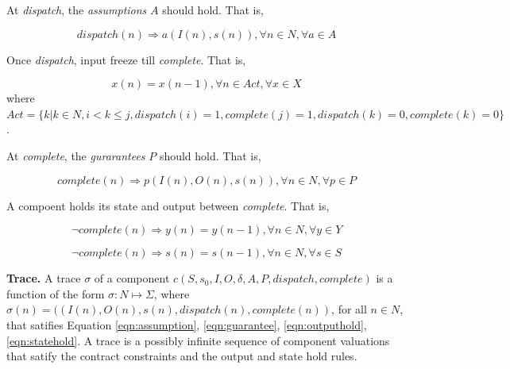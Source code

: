 At \emph{dispatch}, the \emph{assumptions} $A$ should hold. That is,

\begin{equation} 
\label{eqn:assumption}
dispatch(n) \Rightarrow a(I(n), s(n)), \forall n\in N, \forall a \in A
\end{equation}

Once \emph{dispatch}, input freeze till \emph{complete}. That is,

\begin{equation} 
\label{eqn:inputfreeze}
x(n) = x(n-1), \forall n\in Act, \forall x \in X
\end{equation}
where $Act = \{k | k\in N, i<k\le j, dispatch(i)=1, complete(j) = 1, dispatch(k)=0, complete(k)=0\}$.

At \emph{complete}, the \emph{gurarantees} $P$ should hold. That is,

\begin{equation} 
\label{eqn:guarantee}
complete(n) \Rightarrow p(I(n), O(n), s(n)), \forall n\in N, \forall p \in P
\end{equation}

A compoent holds its state and output between \emph{complete}. That is,

\begin{equation} 
\label{eqn:outputhold}
\lnot complete(n) \Rightarrow y(n) = y(n-1), \forall n \in N, \forall y \in Y
\end{equation}

\begin{equation} 
\label{eqn:statehold}
\lnot complete(n) \Rightarrow s(n) = s(n-1), \forall n \in N, \forall s \in S
\end{equation}


{\bf Trace.}
A trace $\sigma$ of a component $c(S, s_0, I, O, \delta, A, P, dispatch, complete)$ is a function of the form $\sigma: N \mapsto \Sigma$, where
$\sigma(n) = ((I(n), O(n), s(n), dispatch(n), complete(n))$, for all $n\in N$, that satifies Equation \ref{eqn:assumption}, \ref{eqn:guarantee}, \ref{eqn:outputhold}, \ref{eqn:statehold}. %
A trace is a possibly infinite sequence of component valuations that satify the contract constraints and the output and state hold rules. 

